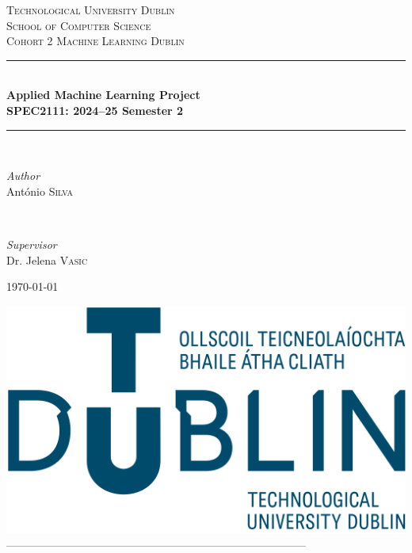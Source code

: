 \begin{titlepage}
	\newcommand{\HRule}{\rule{\linewidth}{0.5mm}} 
	\center 
	\textsc{\LARGE Technological University Dublin
}\\[1.5cm]
	\textsc{\Large School of Computer Science}\\[0.5cm] 
	\textsc{\large Cohort 2 Machine Learning Dublin}\\[0.5cm] 
	\HRule\\[0.4cm]
	
	{\LARGE\bfseries Applied Machine Learning Project\\[0.2cm] SPEC2111: 2024--25 Semester 2}\\[0.4cm]
	\HRule\\[1.5cm]
	
	\begin{minipage}{0.4\textwidth}
		\begin{flushleft}
			\large
			\textit{Author}\\
			António \textsc{Silva}
		\end{flushleft}
	\end{minipage}
	~
	\begin{minipage}{0.4\textwidth}
		\begin{flushright}
			\large
			\textit{Supervisor}\\
			Dr. Jelena \textsc{Vasic}
		\end{flushright}
	\end{minipage}

	\vfill\vfill\vfill 
	
	{\large\today} 
	
	
	\vfill\vfill
	\includegraphics[width=0.25\linewidth]{img/sections/front/tudublinlogo.png}\\[1cm] 
 ---------------------------------------------------------------------------------
	\vfill 	
\end{titlepage}
\thispagestyle{empty}
\newpage
\maketitle
\thispagestyle{empty}


